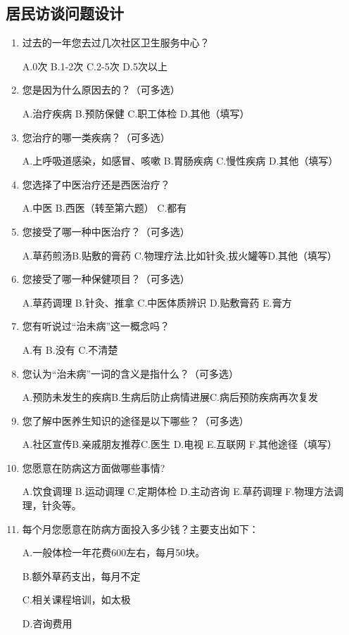 \subsection{居民访谈问题设计}

\begin{enumerate}
\item 过去的一年您去过几次社区卫生服务中心？

A.0次 \qquad
B.1-2次\qquad
C.2-5次\qquad
D.5次以上

\item 您是因为什么原因去的？（可多选）

A.治疗疾病 \qquad
B.预防保健\qquad
C.职工体检\qquad
D.其他（填写）\underline{\makebox[6em]{}}

\item 您治疗的哪一类疾病？（可多选）

A.上呼吸道感染，如感冒、咳嗽\qquad
B.胃肠疾病\qquad
C.慢性疾病\qquad
D.其他（填写）\underline{\makebox[6em]{}}

\item 您选择了中医治疗还是西医治疗？

A.中医\qquad
B.西医（转至第六题）\qquad
C.都有

\item
您接受了哪一种中医治疗？（可多选）

A.草药煎汤\qquad B.贴敷的膏药\qquad 
C.物理疗法,比如针灸,拔火罐等\qquad D.其他（填写）\underline{\makebox[6em]{}}

\item 您接受了哪一种保健项目？（可多选）

A.草药调理\qquad
B.针灸、推拿\qquad
C.中医体质辨识\qquad
D.贴敷膏药\qquad
E.膏方

\item 您有听说过“治未病”这一概念吗？

A.有\qquad
B.没有\qquad
C.不清楚

\item 您认为“治未病”一词的含义是指什么？（可多选）

A.预防未发生的疾病\qquad B.生病后防止病情进展\qquad C.病后预防疾病再次复发

\item 您了解中医养生知识的途径是以下哪些？（可多选）

A.社区宣传\qquad B.亲戚朋友推荐\qquad C.医生\qquad
D.电视\qquad
E.互联网\qquad
F.其他途径（填写）\underline{\makebox[6em]{}}

\item 您愿意在防病这方面做哪些事情?

A.饮食调理\quad
B.运动调理\quad
C.定期体检\quad
D.主动咨询\quad
E.草药调理\quad
F.物理方法调理，针灸等。

\item 每个月您愿意在防病方面投入多少钱？主要支出如下：

A.一般体检一年花费600左右，每月50块。

B.额外草药支出，每月不定

C.相关课程培训，如太极

D.咨询费用

\end{enumerate}